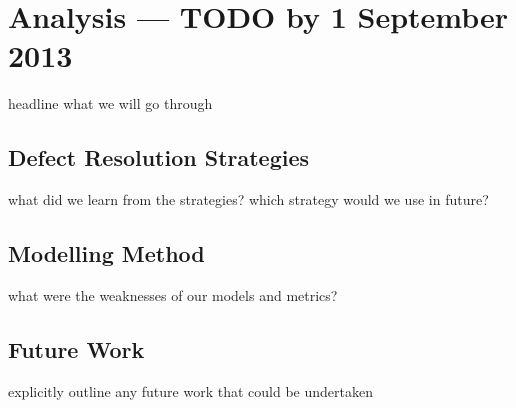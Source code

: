 \section{Analysis --- TODO by 1 September 2013}

\FIXME headline what we will go through

\subsection{Defect Resolution Strategies}

\FIXME what did we learn from the strategies? which strategy would we use in
future?

\subsection{Modelling Method}

\FIXME what were the weaknesses of our models and metrics?

\subsection{Future Work}

\FIXME explicitly outline any future work that could be undertaken
